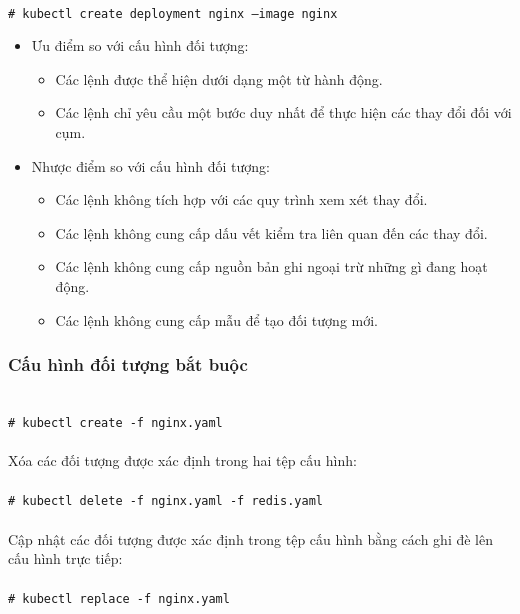 \documentclass[12pt,a4paper]{report}
\newcommand{\shellcmd}[1]{\\\indent\indent\texttt{\footnotesize\# #1}\\}
\begin{document}
	\hspace{0.3cm}{Đây là cách được đề xuất để bắt đầu hoặc chạy tác vụ một lần trong cụm. Vì kỹ thuật này hoạt động trực tiếp trên các đối tượng trực tiếp nên nó không cung cấp lịch sử của các cấu hình trước đó. \\}
	
	\shellcmd{kubectl create deployment nginx --image nginx}
	
	\begin{itemize}
		\item Ưu điểm so với cấu hình đối tượng:
		\begin{itemize}
			\item Các lệnh được thể hiện dưới dạng một từ hành động.
			\item Các lệnh chỉ yêu cầu một bước duy nhất để thực hiện các thay đổi đối với cụm.
		\end{itemize}
		\item Nhược điểm so với cấu hình đối tượng:
		\begin{itemize}
			\item Các lệnh không tích hợp với các quy trình xem xét thay đổi.
			\item Các lệnh không cung cấp dấu vết kiểm tra liên quan đến các thay đổi.
			\item Các lệnh không cung cấp nguồn bản ghi ngoại trừ những gì đang hoạt động.
			\item Các lệnh không cung cấp mẫu để tạo đối tượng mới.
		\end{itemize}
	\end{itemize}
	
	\subsubsection{Cấu hình đối tượng bắt buộc}
	\smallskip
	
	\shellcmd{kubectl create -f nginx.yaml \\}
	Xóa các đối tượng được xác định trong hai tệp cấu hình:\\
	\shellcmd{kubectl delete -f nginx.yaml -f redis.yaml\\}
	Cập nhật các đối tượng được xác định trong tệp cấu hình bằng cách ghi đè lên cấu hình trực tiếp:\\
	\shellcmd{kubectl replace -f nginx.yaml}
	
\end{document}
